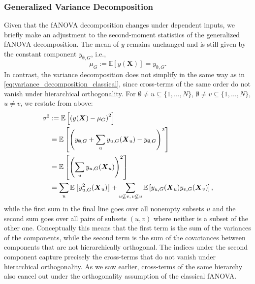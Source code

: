 \subsubsection{Generalized Variance Decomposition}
Given that the fANOVA decomposition changes under dependent inputs, we briefly make an adjustment to the second-moment statistics of the generalized fANOVA decomposition.
The mean of $y$ remains unchanged and is still given by the constant component \( y_{\emptyset,G} \), i.e.,
\[
\mu_G := \mathbb{E}[y(\boldsymbol{X})] = y_{\emptyset,G}.
\]
In contrast, the variance decomposition does not simplify in the same way as in \autoref{eq:variance_decomposition_classical}, since cross-terms of the same order do not vanish under hierarchical orthogonality.
For $ \emptyset \neq u \subseteq \{1,\dots,N\}$, $\emptyset \neq v \subseteq \{1,\dots,N\}$, $u \neq v$, we restate from above:
\begin{align*}
\sigma^2 
&:= \mathbb{E}\left[ \left( y(\boldsymbol{X}) - \mu_G \right)^2 \right] \notag \\
&= \mathbb{E} \left[ \left( y_{\emptyset,G} + \sum_{u} y_{u,G}(\boldsymbol{X}_u) - y_{\emptyset,G} \right)^2 \right] \notag \\
&= \mathbb{E} \left[ \left( \sum_{u} y_{u,G}(\boldsymbol{X}_u) \right)^2 \right] \notag \\
&= \sum_{u} \mathbb{E} \left[ y_{u,G}^2(\boldsymbol{X}_u) \right]
+ \sum_{\substack{u \not\subseteq v,\, v \not\subseteq u}} 
\mathbb{E} \left[ y_{u,G}(\boldsymbol{X}_u) y_{v,G}(\boldsymbol{X}_v) \right],
\end{align*}
while the first sum in the final line goes over all nonempty subsets $u$ and the second sum goes over all pairs of subsets $(u, v)$ where neither is a subset of the other one.
Conceptually this means that the first term is the sum of the variances of the components, while the second term is the sum of the covariances between components that are not hierarchically orthogonal.
The indices under the second component capture precisely the cross-terms that do not vanish under hierarchical orthogonality. As we saw earlier, cross-terms of the same hierarchy also cancel out under the orthogonality assumption of the classical fANOVA.
